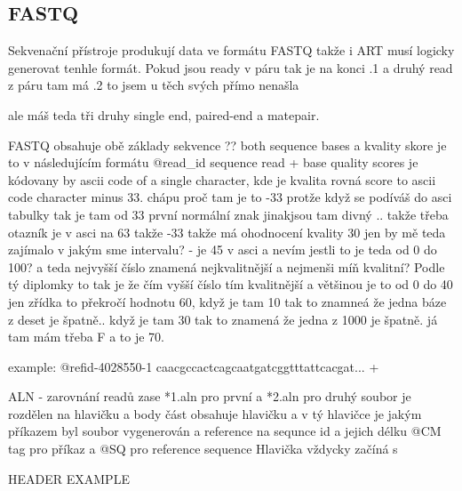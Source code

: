 \documentclass[czech,DP]{thesiskiv}
\numberwithin{equation}{section}
\begin{document}
\subsection{FASTQ}
Sekvenační přístroje produkují data ve formátu FASTQ takže i ART musí logicky generovat tenhle formát.
Pokud jsou ready v páru tak je na konci .1
a druhý read z páru tam má .2 to jsem u těch svých přímo nenašla 

ale máš teda tři druhy single end, paired-end a matepair. 

FASTQ obsahuje obě základy sekvence ?? both sequence bases a kvality skore je to v následujícím formátu
@read\_id
sequence read
+
base quality scores je kódovany by ascii code of a single character, kde je kvalita rovná score to ascii code character minus 33. chápu proč tam je to -33 protže když se podíváš do asci tabulky tak je tam od 33 první normální znak jinakjsou tam divný .. 
takže třeba otazník je v asci na 63 takže -33 takže má ohodnocení kvality 30
jen by mě teda zajímalo v jakým sme intervalu? - je 45 v asci a nevím jestli to je teda od 0 do 100?  a teda nejvyšší číslo znamená nejkvalitnější a nejmenši míň kvalitní? Podle tý diplomky to tak je že čím vyšší číslo tím kvalitnější a většinou je to od 0 do 40 jen zřídka to překročí hodnotu 60, když je tam 10 tak to znamneá že jedna báze z deset je špatně.. když je tam 30 tak to znamená že jedna z 1000 je špatně.
já tam mám třeba F a to je 70.

example:
		@refid-4028550-1 
		caacgccactcagcaatgatcggtttattcacgat...
		+ 

ALN - zarovnání readů
zase *1.aln pro první a *2.aln pro druhý
soubor je rozdělen na hlavičku a body část
obsahuje hlavičku a v tý hlavičce je jakým příkazem byl soubor vygenerován a reference na sequnce id a jejich délku
@CM tag pro příkaz a
@SQ pro reference sequence
Hlavička vždycky začíná s 

		HEADER EXAMPLE

	
\end{document}
